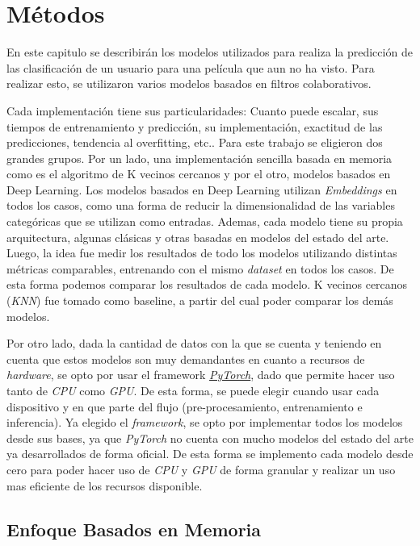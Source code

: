 \documentclass[11pt,a4paper,twoside]{thesis}
\begin{document}
\chapter{Métodos}

En este capitulo se describirán los modelos utilizados para realiza la predicción de las clasificación de un usuario para una película que aun no ha visto. Para realizar esto, se utilizaron varios modelos basados en filtros colaborativos. 

Cada implementación tiene sus particularidades:  Cuanto puede escalar, sus tiempos de entrenamiento y predicción, su implementación, exactitud de las predicciones, tendencia al overfitting, etc.. Para este trabajo se eligieron dos grandes grupos. Por un lado, una implementación sencilla basada en memoria como es el algoritmo de K vecinos cercanos y por el otro, modelos basados en Deep Learning. Los modelos basados en Deep Learning utilizan \textit{Embeddings} en todos los casos, como una forma de reducir la dimensionalidad de las variables categóricas que se utilizan como entradas. Ademas, cada modelo tiene su propia arquitectura, algunas clásicas y otras basadas en modelos del estado del arte. Luego, la idea fue medir los resultados de todo los modelos utilizando distintas métricas comparables, entrenando con el mismo \textit{dataset} en todos los casos. De esta forma podemos comparar los resultados de cada modelo. K vecinos cercanos (\textit{KNN}) fue tomado como baseline, a partir del cual poder comparar los demás modelos.

Por otro lado, dada la cantidad de datos con la que se cuenta y teniendo en cuenta que estos modelos son muy demandantes en cuanto a recursos de \textit{hardware}, se opto por usar el framework \href{https://pytorch.org/}{\textit{PyTorch}}, dado que permite hacer uso tanto de \textit{CPU} como \textit{GPU}. De esta forma, se puede elegir cuando usar cada dispositivo y en que parte del flujo (pre-procesamiento, entrenamiento e inferencia). Ya elegido el \textit{framework}, se opto por implementar todos los modelos desde sus bases, ya que \textit{PyTorch} no cuenta con mucho modelos del estado del arte ya desarrollados de forma oficial. De esta forma se implemento cada modelo desde cero para poder hacer uso de \textit{CPU} y \textit{GPU} de forma granular y realizar un uso mas eficiente de los recursos disponible.

\section{Enfoque Basados en Memoria}
\end{document}
